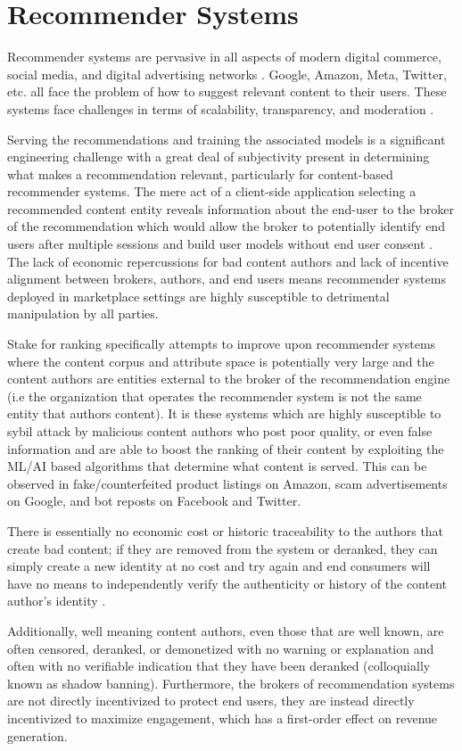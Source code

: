 \section{Recommender Systems}

Recommender systems are pervasive in all aspects of modern digital commerce, social media, and digital advertising networks \cite{resnick1997recommender} \cite{lops2011content} \cite{gomez2015netflix}. Google, Amazon, Meta, Twitter, etc. all face the problem of how to suggest relevant content to their users. These systems face challenges in terms of scalability, transparency, and moderation \cite{wang2022trustworthy}. 

Serving the recommendations and training the associated models is a significant engineering challenge with a great deal of subjectivity present in determining what makes a recommendation relevant, particularly for content-based recommender systems. The mere act of a client-side application selecting a recommended content entity reveals information about the end-user to the broker of the recommendation which would allow the broker to potentially identify end users after multiple sessions and build user models without end user consent \cite{boutet2018collaborative}. The lack of economic repercussions for bad content authors and lack of incentive alignment between brokers, authors, and end users means recommender systems deployed in marketplace settings are highly susceptible to detrimental manipulation by all parties.

Stake for ranking specifically attempts to improve upon recommender systems where the content corpus and attribute space is potentially very large and the content authors are entities external to the broker of the recommendation engine (i.e the organization that operates the recommender system is not the same entity that authors content). It is these systems which are highly susceptible to sybil attack by malicious content authors who post poor quality, or even false information and are able to boost the ranking of their content by exploiting the ML/AI based algorithms that determine what content is served. This can be observed in fake/counterfeited product listings on Amazon, scam advertisements on Google, and bot reposts on Facebook and Twitter. 

There is essentially no economic cost or historic traceability to the authors that create bad content; if they are removed from the system or deranked, they can simply create a new identity at no cost and try again and end consumers will have no means to independently verify the authenticity or history of the content author's identity \cite{lin2022shilling}. 

Additionally, well meaning content authors, even those that are well known, are often censored, deranked, or demonetized with no warning or explanation and often with no verifiable indication that they have been deranked (colloquially known as shadow banning). Furthermore, the brokers of recommendation systems are not directly incentivized to protect end users, they are instead directly incentivized to maximize engagement, which has a first-order effect on revenue generation. 
